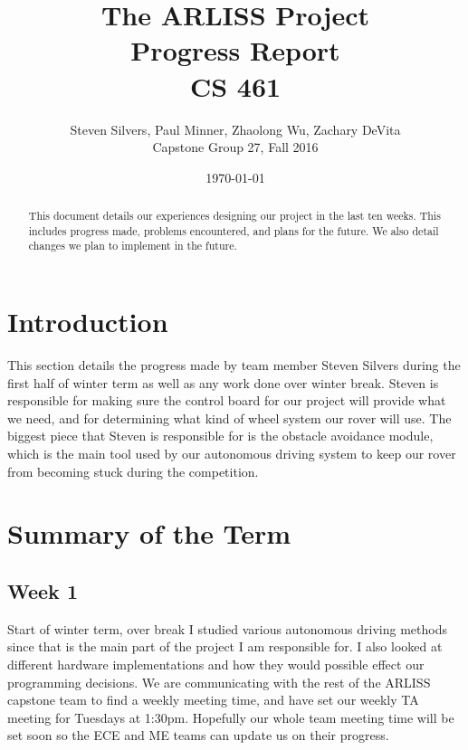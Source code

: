 \documentclass[10pt,letterpaper,onecolumn,draftclsnofoot,journal]{IEEEtran}
\begin{document}
\begin{titlepage}
	\title{The ARLISS Project\\Progress Report\\CS 461}
	\author{Steven Silvers, Paul Minner, Zhaolong Wu, Zachary DeVita\\
		Capstone Group 27, Fall 2016}
	\date{\today}
	\maketitle
	\vspace{4cm}
	\begin{abstract}
		\noindent This document details our experiences designing our project in the last ten weeks. This includes progress made, problems encountered, and plans for the future. We also detail changes we plan to implement in the future.
	\end{abstract}

\end{titlepage}
\tableofcontents
\clearpage

\section{Introduction}
This section details the progress made by team member Steven Silvers during the first half of winter term  as well as any work done over winter break. Steven is responsible for making sure the control board for our project will provide what we need, and for determining what kind of wheel system our rover will use. The biggest piece that Steven is responsible for is the obstacle avoidance module, which is the main tool used by our autonomous driving system to keep our rover from becoming stuck during the competition.

\section{Summary of the Term}
\subsection{Week 1}
Start of winter term, over break I studied various autonomous driving methods since that is the main part of the project I am responsible for. I also looked at different hardware implementations and how they would possible effect our programming decisions. We are communicating with the rest of the ARLISS capstone team to find a weekly meeting time, and have set our weekly TA meeting for Tuesdays at 1:30pm. Hopefully our whole team meeting time will be set soon so the ECE and ME teams can update us on their progress.
\end{document}
